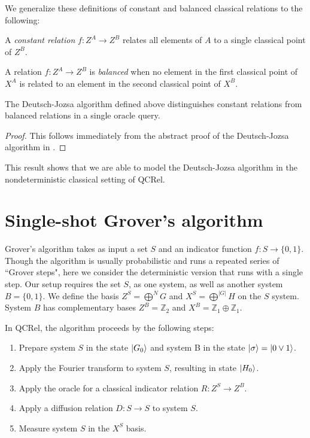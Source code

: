 We generalize these definitions of constant and balanced classical relations to the following:
\begin{definition}
\label{def:const}
A \emph{constant relation} $f:Z^{A}\to Z^{B}$ relates all elements of $A$ to a single classical point of $Z^B$.
\end{definition}

\begin{definition}
\label{def:balanced}
A relation $f:Z^{A}\to Z^{B}$ is \emph{balanced} when no element in the first classical point of $X^{A}$ is related to an element in the second classical point of $X^{B}$.
\end{definition}

\begin{theorem}
\label{thm:dj_speedup}
The Deutsch-Jozsa algorithm defined above distinguishes constant relations from balanced relations in a single oracle query.
\end{theorem}
\begin{proof}
This follows immediately from the abstract proof of the Deutsch-Jozsa algorithm in \cite{vicary-tqa}.
\end{proof}

This result shows that we are able to model the Deutsch-Jozsa algorithm in the nondeterministic classical setting of QCRel.

\section{Single-shot Grover's algorithm}

Grover's algorithm \cite{grover1996fast} takes as input a set $S$ and an indicator function $f:S\to\{0,1\}$. Though the algorithm is usually probabilistic and runs a repeated series of ``Grover steps", here we consider the deterministic version that runs with a single step. Our setup requires the set $S$, as one system, as well as another system $B=\{0,1\}$. We define the basis $Z^{S}=\bigoplus^NG$ and $X^S=\bigoplus^{|G|}H$ on the $S$ system.  System $B$ has complementary bases $Z^B=\mathbb{Z}_2$ and $X^B=\mathbb{Z}_1\oplus\mathbb{Z}_1$.

In QCRel, the algorithm proceeds by the following steps:
\begin{enumerate}
\item Prepare system $S$ in the state $| G_0 \rangle$ and system B in the state $| \sigma \rangle = | 0\vee 1 \rangle$.

\item Apply the Fourier transform to system $S$, resulting in state $| H_0 \rangle$.

\item Apply the oracle for a classical indicator relation $R:Z^S\to Z^B$.

\item Apply a diffusion relation $D:S\to S$ to system $S$.

\item Measure system $S$ in the $X^S$ basis.

\end{enumerate}

